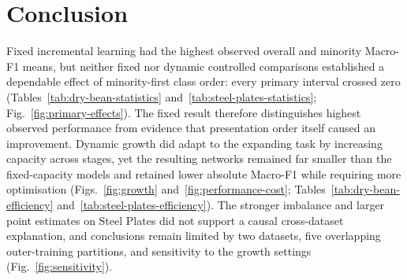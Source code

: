 \documentclass[conference,10pt]{IEEEtran}
\begin{document}
\section{Conclusion}
Fixed incremental learning had the highest observed overall and minority Macro-F1 means, but neither fixed nor dynamic controlled comparisons established a dependable effect of minority-first class order: every primary interval crossed zero (Tables~\ref{tab:dry-bean-statistics} and~\ref{tab:steel-plates-statistics}; Fig.~\ref{fig:primary-effects}). The fixed result therefore distinguishes highest observed performance from evidence that presentation order itself caused an improvement. Dynamic growth did adapt to the expanding task by increasing capacity across stages, yet the resulting networks remained far smaller than the fixed-capacity models and retained lower absolute Macro-F1 while requiring more optimisation (Figs.~\ref{fig:growth} and~\ref{fig:performance-cost}; Tables~\ref{tab:dry-bean-efficiency} and~\ref{tab:steel-plates-efficiency}). The stronger imbalance and larger point estimates on Steel Plates did not support a causal cross-dataset explanation, and conclusions remain limited by two datasets, five overlapping outer-training partitions, and sensitivity to the growth settings (Fig.~\ref{fig:sensitivity}).


\setlength{\emergencystretch}{3em}\sloppy

\end{document}
